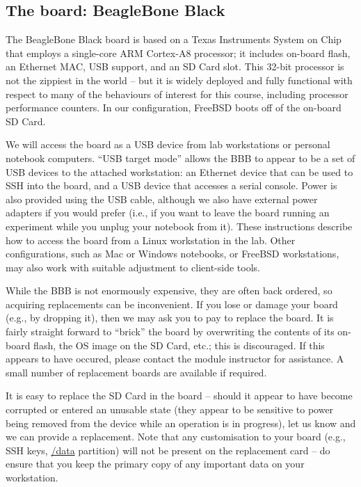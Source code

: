 \documentclass[a4paper,10pt]{article}
\begin{document}
\subsection*{The board: BeagleBone Black}

The BeagleBone Black board is based on a Texas Instruments System on Chip that
employs a single-core ARM Cortex-A8 processor; it includes on-board flash, an
Ethernet MAC, USB support, and an SD Card slot.
This 32-bit processor is not the zippiest in the world -- but it is widely
deployed and fully functional with respect to many of the behaviours of
interest for this course, including processor performance counters.
In our configuration, FreeBSD boots off of the on-board SD Card.

We will access the board as a USB device from lab workstations or personal
notebook computers.
``USB target mode'' allows the BBB to appear to be a set of USB devices to the
attached workstation: an Ethernet device that can be used to SSH into the
board, and a USB device that accesses a serial console.
Power is also provided using the USB cable, although we also have external
power adapters if you would prefer (i.e., if you want to leave the board
running an experiment while you unplug your notebook from it).
These instructions describe how to access the board from a Linux workstation
in the lab.
Other configurations, such as Mac or Windows notebooks, or FreeBSD
workstations, may also work with suitable adjustment to client-side tools.

While the BBB is not enormously expensive, they are often back ordered, so
acquiring replacements can be inconvenient.
If you lose or damage your board (e.g., by dropping it), then we may ask you
to pay to replace the board.
It is fairly straight forward to ``brick'' the board by overwriting the
contents of its on-board flash, the OS image on the SD Card, etc.; this is
discouraged.
If this appears to have occured, please contact the module instructor for
assistance.
A small number of replacement boards are available if required.

It is easy to replace the SD Card in the board -- should it appear to have
become corrupted or entered an unusable state (they appear to be sensitive to
power being removed from the device while an operation is in progress), let us
know and we can provide a replacement.
Note that any customisation to your board (e.g., SSH keys, \url{/data}
partition) will not be present on the replacement card -- do ensure that you
keep the primary copy of any important data on your workstation.
\end{document}
